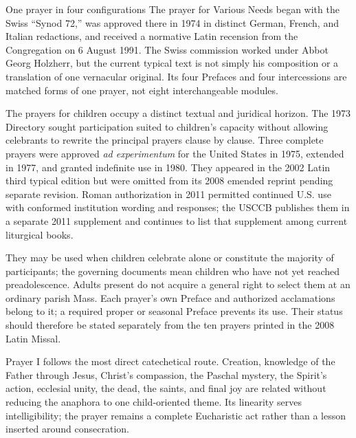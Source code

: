 \begin{studybox}{One prayer in four configurations}
The prayer for Various Needs began with the Swiss ``Synod 72,'' was approved there in 1974 in distinct German, French, and Italian redactions, and received a normative Latin recension from the Congregation on 6 August 1991. The Swiss commission worked under Abbot Georg Holzherr, but the current typical text is not simply his composition or a translation of one vernacular original. Its four Prefaces and four intercessions are matched forms of one prayer, not eight interchangeable modules.
\end{studybox}


The prayers for children occupy a distinct textual and juridical horizon. The 1973 Directory sought participation suited to children's capacity without allowing celebrants to rewrite the principal prayers clause by clause. Three complete prayers were approved \emph{ad experimentum} for the United States in 1975, extended in 1977, and granted indefinite use in 1980. They appeared in the 2002 Latin third typical edition but were omitted from its 2008 emended reprint pending separate revision. Roman authorization in 2011 permitted continued U.S. use with conformed institution wording and responses; the USCCB publishes them in a separate 2011 supplement and continues to list that supplement among current liturgical books.

They may be used when children celebrate alone or constitute the majority of participants; the governing documents mean children who have not yet reached preadolescence. Adults present do not acquire a general right to select them at an ordinary parish Mass. Each prayer's own Preface and authorized acclamations belong to it; a required proper or seasonal Preface prevents its use. Their status should therefore be stated separately from the ten prayers printed in the 2008 Latin Missal.

Prayer I follows the most direct catechetical route. Creation, knowledge of the Father through Jesus, Christ's compassion, the Paschal mystery, the Spirit's action, ecclesial unity, the dead, the saints, and final joy are related without reducing the anaphora to one child-oriented theme. Its linearity serves intelligibility; the prayer remains a complete Eucharistic act rather than a lesson inserted around consecration.

